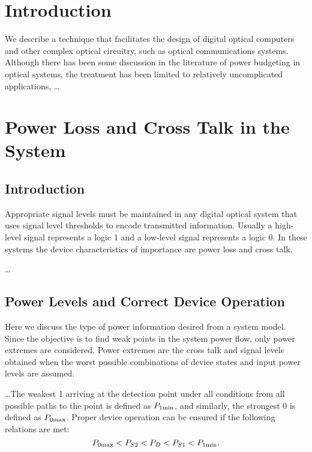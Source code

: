   \section{ Introduction}
          We describe a technique that facilitates the design
 of digital optical computers and other complex optical circuitry,
     such as optical communications systems.  Although there has
been       some discussion in the literature of power budgeting in
optical       systems,\cite{1,2} the treatment has been limited to
relatively       uncomplicated applications, \ldots



   \section{Power Loss and Cross Talk in the System}

\subsection{ Introduction}
Appropriate signal levels must be maintained in any digital
optical system that uses signal level thresholds to encode
transmitted information.  Usually a high-level signal represents a
     logic 1 and a low-level signal represents a logic 0.  In these
     systems the device characteristics of importance are power
loss and       cross talk.

\ldots

\subsection{Power Levels and Correct Device Operation}
Here we discuss the type of power information desired from a
system model.  Since the objective is to find weak points in the
    system power flow, only power extremes are considered.  Power
     extremes are the cross talk and signal levels obtained when
the worst       possible combinations of device states and input
power levels are  assumed.

\ldots        The weakest 1 arriving at the
detection point under all conditions from all possible paths
to the point is defined as $P_{1\rm min}$, and similarly, the
strongest 0 is defined as $ P_{0\rm max}$.   Proper
device operation can be ensured if the following relations
are met:
\begin{equation}      P_{0\rm max} < P_{S2} < P_{D}  <
P_{S1} < P_{1\rm min}.\label{p0} \end{equation}

